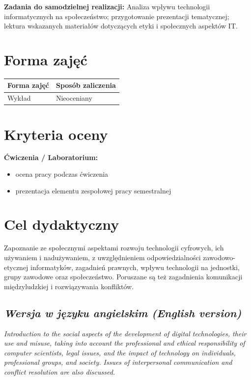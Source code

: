 \documentclass[12pt, a4paper]{article}
\newcommand{\thdrule}{\noalign{\global\setlength{\extrarowheight}{0pt}}}
\newcommand{\thdend}{\noalign{\global\setlength{\extrarowheight}{3pt}}}
\begin{document}
\vspace{4pt}
\noindent\textbf{Zadania do samodzielnej realizacji:} Analiza wpływu technologii informatycznych na społeczeństwo; przygotowanie prezentacji tematycznej; lektura wskazanych materiałów dotyczących etyki i społecznych aspektów IT.

\section{Forma zajęć}

\begin{center}
{\scriptsize
\begin{tabular}{m{5cm}m{8cm}}
\thdrule\toprule
\rowcolor{pjatkRed} {\color{white}\textbf{Forma zajęć}} & {\color{white}\textbf{Sposób zaliczenia}} \\
\midrule\thdend
  \rowcolor{tableRowLight} Wykład & Nieoceniany \\
\bottomrule
\end{tabular}}
\end{center}

\section{Kryteria oceny}

\textbf{Ćwiczenia / Laboratorium:}
\begin{itemize}
  \item ocena pracy podczas ćwiczenia
  \item prezentacja elementu zespołowej pracy semestralnej
\end{itemize}


\section{Cel dydaktyczny}

Zapoznanie ze społecznymi aspektami rozwoju technologii cyfrowych, ich używaniem i nadużywaniem, z uwzględnieniem odpowiedzialności zawodowo-etycznej informatyków, zagadnień prawnych, wpływu technologii na jednostki, grupy zawodowe oraz społeczeństwo. Poruszane są też zagadnienia komunikacji międzyludzkiej i rozwiązywania konfliktów.

\subsection*{\textit{Wersja w języku angielskim (English version)}}

\textit{Introduction to the social aspects of the development of digital technologies, their use and misuse, taking into account the professional and ethical responsibility of computer scientists, legal issues, and the impact of technology on individuals, professional groups, and society. Issues of interpersonal communication and conflict resolution are also discussed.}
\end{document}
